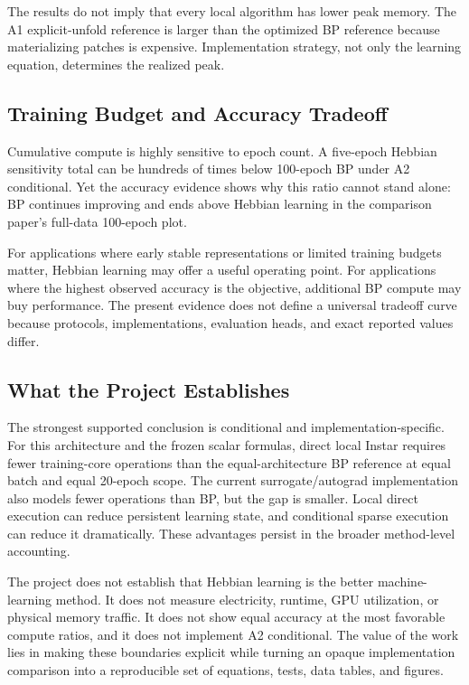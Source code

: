 \documentclass{article}
\begin{document}
    The results do not imply that every local algorithm has lower peak memory. The A1 explicit-unfold reference is larger than the optimized BP reference because materializing patches is expensive. Implementation strategy, not only the learning equation, determines the realized peak.
    
    \subsection{Training Budget and Accuracy Tradeoff}
    
    Cumulative compute is highly sensitive to epoch count. A five-epoch Hebbian sensitivity total can be hundreds of times below 100-epoch BP under A2 conditional. Yet the accuracy evidence shows why this ratio cannot stand alone: BP continues improving and ends above Hebbian learning in the comparison paper's full-data 100-epoch plot.
    
    For applications where early stable representations or limited training budgets matter, Hebbian learning may offer a useful operating point. For applications where the highest observed accuracy is the objective, additional BP compute may buy performance. The present evidence does not define a universal tradeoff curve because protocols, implementations, evaluation heads, and exact reported values differ.
    
    \subsection{What the Project Establishes}
    
    The strongest supported conclusion is conditional and implementation-specific. For this architecture and the frozen scalar formulas, direct local Instar requires fewer training-core operations than the equal-architecture BP reference at equal batch and equal 20-epoch scope. The current surrogate/autograd implementation also models fewer operations than BP, but the gap is smaller. Local direct execution can reduce persistent learning state, and conditional sparse execution can reduce it dramatically. These advantages persist in the broader method-level accounting.
    
    The project does not establish that Hebbian learning is the better machine-learning method. It does not measure electricity, runtime, GPU utilization, or physical memory traffic. It does not show equal accuracy at the most favorable compute ratios, and it does not implement A2 conditional. The value of the work lies in making these boundaries explicit while turning an opaque implementation comparison into a reproducible set of equations, tests, data tables, and figures.
    
\end{document}
